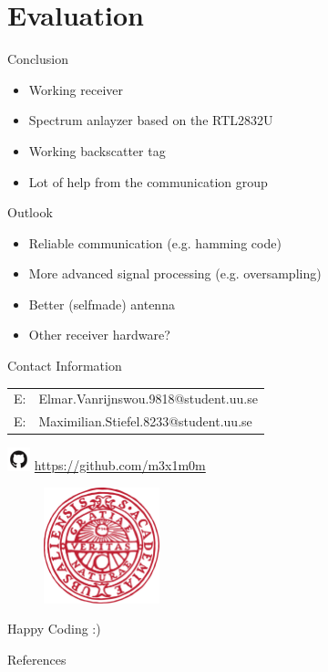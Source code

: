 \documentclass[apectratio=169]{beamer}
\begin{document}
\section{Evaluation}
\begin{frame}{Conclusion}
\begin{itemize}
	\item Working receiver \checkmark
	\item Spectrum anlayzer based on the RTL2832U \checkmark 
	\item Working backscatter tag \checkmark
	\item Lot of help from the communication group \checkmark
\end{itemize}
\end{frame}

\begin{frame}{Outlook}
\begin{itemize}
	\item Reliable communication (e.g. hamming code)
	\item More advanced signal processing (e.g. oversampling) 
	\item Better (selfmade) antenna
	\item Other receiver hardware? 
\end{itemize}
\end{frame}

   	\begin{frame}{Contact Information}
        	\begin{center}
                \begin{table}[]
                        \begin{tabular}{ll}
                                E: & Elmar.Vanrijnswou.9818@student.uu.se \\
                             	E: & Maximilian.Stiefel.8233@student.uu.se\\
                        \end{tabular}
                \end{table}
                \includegraphics[width=0.05\textwidth]{./fig/github} \hspace{0.1cm} \url{https://github.com/m3x1m0m}\\
        	\end{center}
        	\begin{figure}
                	\includegraphics[width=0.3\textwidth]{./fig/logo}
        	\end{figure}
  	\end{frame}

\begin{frame}[standout]
	Happy Coding :) 
\end{frame}

\begin{frame}[allowframebreaks]{References}

  
  

\end{frame}
\end{document}
